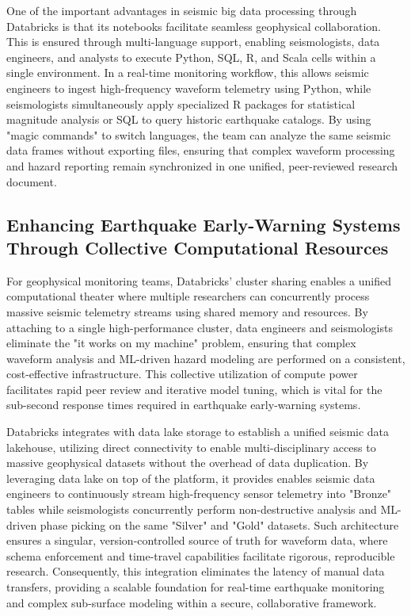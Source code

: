 \documentclass[data,article,submit,pdftex,moreauthors]{Definitions/mdpi}
\begin{document}
One of the important advantages in seismic big data processing through Databricks is that its notebooks facilitate seamless geophysical collaboration. This is ensured through multi-language support, enabling seismologists, data engineers, and analysts to execute Python, SQL, R, and Scala cells within a single environment. In a real-time monitoring workflow, this allows seismic engineers to ingest high-frequency waveform telemetry using Python, while seismologists simultaneously apply specialized R packages for statistical magnitude analysis or SQL to query historic earthquake catalogs. By using "magic commands" to switch languages, the team can analyze the same seismic data frames without exporting files, ensuring that complex waveform processing and hazard reporting remain synchronized in one unified, peer-reviewed research document.

\subsection{Enhancing Earthquake Early-Warning Systems Through Collective Computational Resources}

For geophysical monitoring teams, Databricks’ cluster sharing enables a unified computational theater where multiple researchers can concurrently process massive seismic telemetry streams using shared memory and resources. By attaching to a single high-performance cluster, data engineers and seismologists eliminate the "it works on my machine" problem, ensuring that complex waveform analysis and ML-driven hazard modeling are performed on a consistent, cost-effective infrastructure. This collective utilization of compute power facilitates rapid peer review and iterative model tuning, which is vital for the sub-second response times required in earthquake early-warning systems.

Databricks integrates with data lake storage to establish a unified seismic data lakehouse, utilizing direct connectivity to enable multi-disciplinary access to massive geophysical datasets without the overhead of data duplication. By leveraging data lake on top of the platform, it provides enables seismic data engineers to continuously stream high-frequency sensor telemetry into "Bronze" tables while seismologists concurrently perform non-destructive analysis and ML-driven phase picking on the same "Silver" and "Gold" datasets. Such architecture ensures a singular, version-controlled source of truth for waveform data, where schema enforcement and time-travel capabilities facilitate rigorous, reproducible research. Consequently, this integration eliminates the latency of manual data transfers, providing a scalable foundation for real-time earthquake monitoring and complex sub-surface modeling within a secure, collaborative framework.
\end{document}
